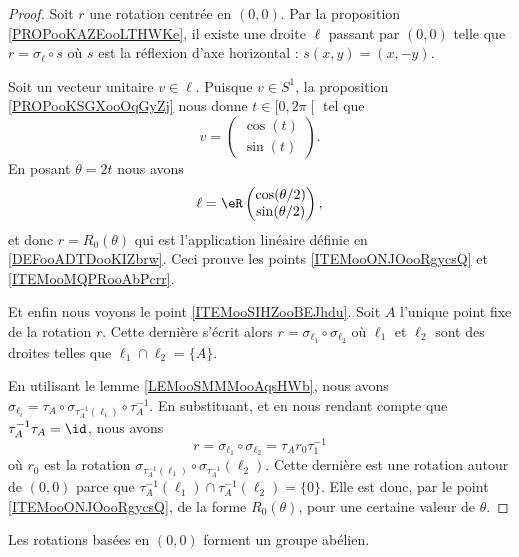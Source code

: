 \begin{proof}
	Soit \( r\) une rotation centrée en \( (0,0)\). Par la proposition \ref{PROPooKAZEooLTHWKe}, il existe une droite \( \ell\) passant par \( (0,0)\) telle que \( r=\sigma_{\ell} \circ s\) où \( s\) est la réflexion d'axe horizontal : \( s(x,y)=(x,-y)\).

	Soit un vecteur unitaire \( v\in \ell\). Puisque \( v\in S^1\), la proposition \ref{PROPooKSGXooOqGyZj} nous donne \( t\in \mathopen[ 0 ,2\pi  \mathclose[\) tel que
	\begin{equation}
		v=\begin{pmatrix}
			\cos(t) \\
			\sin(t)
		\end{pmatrix}.
	\end{equation}
	En posant \( \theta=2 t\) nous avons
	\begin{equation}
		\ell=\eR\begin{pmatrix}
			\cos(\theta/2) \\
			\sin(\theta/2)
		\end{pmatrix},
	\end{equation}
	et donc \( r=R_0(\theta)\) qui est l'application linéaire définie en \ref{DEFooADTDooKIZbrw}. Ceci prouve les points \ref{ITEMooONJOooRgycsQ} et \ref{ITEMooMQPRooAbPcrr}.

	Et enfin nous voyons le point \ref{ITEMooSIHZooBEJhdu}. Soit \( A\) l'unique point fixe de la rotation \( r\). Cette dernière s'écrit alors \( r=\sigma_{\ell_1}\circ\sigma_{\ell_2}\) où \( \ell_1\) et \( \ell_2\) sont des droites telles que \( \ell_1\cap\ell_2=\{ A \}\).

	En utilisant le lemme \ref{LEMooSMMMooAqsHWb}, nous avons \( \sigma_{\ell_i}=\tau_A\circ \sigma_{\tau_A^{-1}(\ell_i)}\circ \tau_A^{-1}\). En substituant, et en nous rendant compte que \( \tau_A^{-1}\tau_A=\id\), nous avons
	\begin{equation}
		r=\sigma_{\ell_1}\circ\sigma_{\ell_2}=\tau_A r_0\tau_1^{-1}
	\end{equation}
	où \( r_0\) est la rotation \( \sigma_{\tau_A^{-1}(\ell_1)}\circ \sigma_{\tau_A^{-1}}(\ell_2)\). Cette dernière est une rotation autour de \( (0,0)\) parce que \( \tau_A^{-1}(\ell_1)\cap \tau_A^{-1}(\ell_2)=\{ 0 \}\). Elle est donc, par le point \ref{ITEMooONJOooRgycsQ}, de la forme \( R_0(\theta)\), pour une certaine valeur de \( \theta\).
\end{proof}

\begin{proposition}      \label{PROPooWMESooNJMdxf}
	Les rotations basées en \( (0,0)\) forment un groupe abélien.
\end{proposition}

